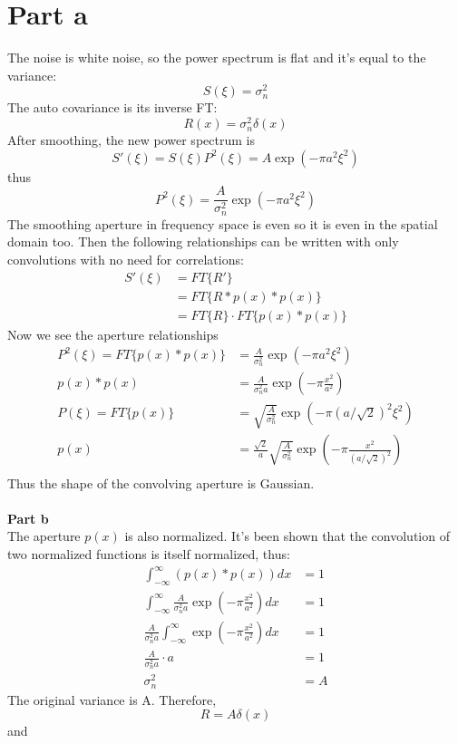 \documentclass[11pt, oneside]{article}   	%
\begin{document}
\section{Part a} %
%
The noise is white noise, so the power spectrum is flat and it's equal to the variance:
\[S(\xi) = \sigma_n^2 \]
The auto covariance is its inverse FT:
\[R(x) = \sigma_n^2 \delta(x) \]
After smoothing, the new power spectrum is 
\[S'(\xi) = S(\xi) P^2(\xi) = A \exp(-\pi a^2 \xi^2) \]
thus 
\[ P^2(\xi) = \frac{A}{\sigma_n^2} \exp(-\pi a^2 \xi^2)  \]
The smoothing aperture in frequency space is even so it is even in the spatial domain too.  Then the following relationships can be written with only convolutions with no need for correlations:
\begin{align*}
S'(\xi) &= FT\{R'\} \\
 &= FT\{R* p(x) * p(x)\} \\ 
 &= FT\{ R\} \cdot FT\{p(x) * p(x)\} 
\end{align*}
Now we see the aperture relationships
\begin{align*}
P^2(\xi) = FT\{p(x) * p(x)\} &=  \frac{A}{\sigma_n^2} \exp(-\pi a^2 \xi^2)  \\
p(x) * p(x) &= \frac{A}{\sigma_n^2 a} \exp(-\pi \frac{x^2}{a^2}) \\
P(\xi) = FT\{p(x)\} &=  \sqrt{\frac{A}{\sigma_n^2}} \exp(-\pi (a/\sqrt{2})^2 \xi^2)  \\
p(x) &= \frac{\sqrt{2}}{a}\sqrt{\frac{A}{\sigma_n^2}} \exp(-\pi \frac{x^2}{(a/\sqrt{2})^2}) \\
\end{align*}
Thus the shape of the convolving aperture is Gaussian. \\ \\
%
\noindent \textbf{Part b} \\
The aperture $p(x)$ is also normalized.  It's been shown that the convolution of two normalized functions is itself normalized, thus:
\begin{align*}
\int_{-\infty}^{\infty} (p(x) * p(x)) dx &= 1 \\
\int_{-\infty}^{\infty} \frac{A}{\sigma_n^2 a} \exp(-\pi \frac{x^2}{a^2}) dx &= 1 \\
\frac{A}{\sigma_n^2 a} \int_{-\infty}^{\infty} \exp(-\pi \frac{x^2}{a^2}) dx &= 1 \\
\frac{A}{\sigma_n^2 a} \cdot a &=1 \\
\sigma_n^2 &= A
\end{align*}
The original variance is A.  Therefore, 
\[R = A \delta(x) \]
and
\end{document}
